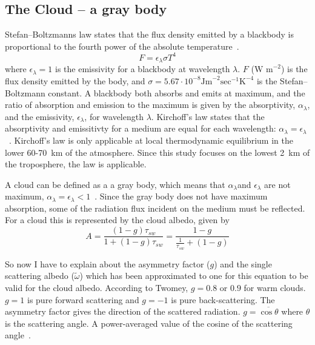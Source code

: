\subsection{The Cloud -- a gray body}
Stefan–Boltzmanns law states that the flux density emitted by a blackbody is proportional to the fourth power of the absolute temperature~\citep{Liou2002}. 
\begin{equation}
F = \epsilon_{\lambda} \sigma T^4
\label{eqn:stefanboltzmann}
\end{equation}
where $\epsilon_{\lambda} = 1$ is the emissivity for a blackbody at wavelength $\lambda$. $F$ ($\text{W~m}^{-2}$) is the flux density emitted  by the body, and $\sigma = 5.67\cdot 10^{-8} \text{Jm}^{-2}\text{sec}^{-1}\text{K}^{-4}$ is the Stefan–Boltzmann constant. A blackbody both absorbs and emits at maximum, and the ratio of absorption and emission to the maximum is given by the absorptivity, $\alpha_{\lambda}$, and the emissivity, $\epsilon_{\lambda}$, for wavelength $\lambda$. Kirchoff's law states that the absorptivity and emissitivty for a medium are equal for each wavelength: $\alpha_{\lambda} = \epsilon_{\lambda}$~\citep{Liou2002}. Kirchoff's law is only applicable at local thermodynamic equilibrium in the lower 60-70~km of the atmosphere. Since this study focuses on the lowest 2~km of the troposphere, the law is applicable.

A cloud can be defined as a a gray body, which means that $\alpha_{\lambda}$and $\epsilon_{\lambda}$ are not maximum, $\alpha_{\lambda}=\epsilon_{\lambda}<1$~\citep{Liou2002}. 
Since the gray body does not have maximum absorption, some of the radiation flux incident on the medium must be reflected. For a cloud this is represented by the cloud albedo, given by~\citep{Hobbs1993}
\begin{equation}
A = \frac{(1-g)\tau_{sw}}{1+(1-g)\tau_{sw}} = \frac{1-g}{\frac{1}{\tau_{sw}}+(1-g)}
\label{eqn:cloudalbedo_theory}
\end{equation}

So now I have to explain about the asymmetry factor ($g$) and the single scattering albedo ($\tilde{\omega}$) which has been approximated to one for this equation to be valid for the cloud albedo. According to Twomey, $g=0.8$ or $0.9$ for warm clouds. $g=1$ is pure forward scattering and $g=-1$ is pure back-scattering. The asymmetry factor gives the direction of the scattered radiation. $g=\overline{\cos \theta}$ where $\theta$ is the scattering angle. A power-averaged value of the cosine of the scattering angle~\citep{Twomey1974}.

